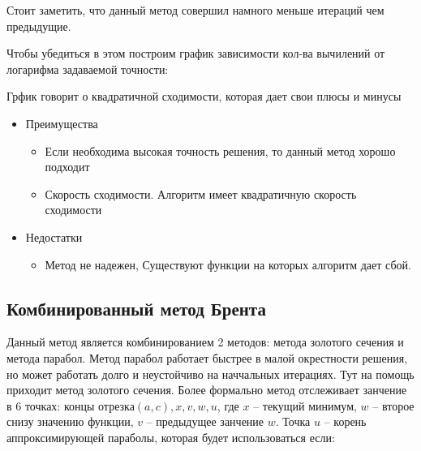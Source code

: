 \documentclass[a4paper, 14pt]{article}
\begin{document}
	Стоит заметить, что данный метод совершил намного меньше итераций чем предыдущие. 
	
	Чтобы убедиться в этом построим график зависимости кол-ва вычилений от логарифма задаваемой точности:
	
	
	Грфик говорит о квадратичной сходимости, которая дает свои плюсы и минусы
	
	\begin{itemize}
		\item Преимущества
			\begin{itemize}
				\item Если необходима высокая точность решения, то данный метод хорошо подходит
				\item Скорость сходимости. Алгоритм имеет квадратичную скорость сходимости
 			\end{itemize}
		\item Недостатки
			\begin{itemize}
			\item Метод не надежен, Существуют функции на которых алгоритм дает сбой.
			\end{itemize}
	\end{itemize}
	
	
	\subsection*{Комбинированный метод Брента}
	Данный метод является комбинированием 2 методов: метода золотого сечения и метода парабол. Метод парабол работает быстрее в малой окрестности решения, но может работать долго и неустойчиво на наччальных итерациях. Тут на помощь приходит метод золотого сечения. Более формально метод отслеживает занчение в 6 точках: 
	концы отрезка$(a, c), x, v, w, u $, где $x$ -- текущий минимум, $w$ -- второе снизу значению функции, $v$ -- предыдущее занчение $w$. Точка $u$ -- корень аппроксимирующей параболы, которая будет использоваться если:
	  
\end{document}
